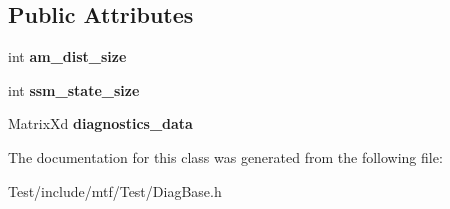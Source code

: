 \subsection*{Public Attributes}
\begin{DoxyCompactItemize}
\item 
\hypertarget{classDiagBase_ad4d3d755e60652be0c047aa53b2467ef}{int {\bfseries am\-\_\-dist\-\_\-size}}\label{classDiagBase_ad4d3d755e60652be0c047aa53b2467ef}

\item 
\hypertarget{classDiagBase_a616730726a2503ca6f2aaeebe403289f}{int {\bfseries ssm\-\_\-state\-\_\-size}}\label{classDiagBase_a616730726a2503ca6f2aaeebe403289f}

\item 
\hypertarget{classDiagBase_a8f6e96646d472f0f46612d95a263dd93}{Matrix\-Xd {\bfseries diagnostics\-\_\-data}}\label{classDiagBase_a8f6e96646d472f0f46612d95a263dd93}

\end{DoxyCompactItemize}


The documentation for this class was generated from the following file\-:\begin{DoxyCompactItemize}
\item 
Test/include/mtf/\-Test/Diag\-Base.\-h\end{DoxyCompactItemize}
